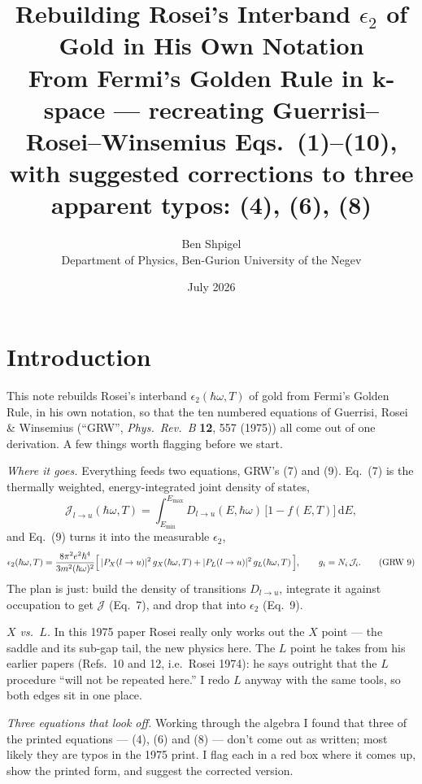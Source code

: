 \documentclass[11pt,a4paper]{article}
\title{\bfseries Rebuilding Rosei's Interband $\epsilon_2$ of Gold in
His Own Notation\\[4pt]
\large From Fermi's Golden Rule in $\mathbf{k}$-space --- recreating
Guerrisi--Rosei--Winsemius Eqs.~(1)--(10), \\ with suggested
corrections to three apparent typos: \textcolor{BrickRed}{(4), (6), (8)}}
\author{Ben Shpigel\\ \small Department of Physics, Ben-Gurion University of the Negev}
\date{July 2026}
\numberwithin{equation}{section}
\newcommand{\hw}{\hbar\omega}
\newcommand{\cJ}{\mathcal{J}}%
\newcommand{\dd}{\mathrm{d}}
\begin{document}
\maketitle

\section*{Introduction}

This note rebuilds Rosei's interband $\epsilon_2(\hw,T)$ of gold from
Fermi's Golden Rule, in his own notation, so that the ten numbered
equations of Guerrisi, Rosei \& Winsemius (``GRW'', \emph{Phys.\ Rev.\
B} \textbf{12}, 557 (1975)) all come out of one derivation. A few
things worth flagging before we start.

\medskip
\noindent\emph{Where it goes.} Everything feeds two equations, GRW's
(7) and (9). Eq.~(7) is the thermally weighted, energy-integrated joint
density of states,
\begin{equation*}
\cJ_{l\to u}(\hw,T)=\int_{E_{\min}}^{E_{\max}}
D_{l\to u}(E,\hw)\,\bigl[1-f(E,T)\bigr]\,\dd E ,
\tag{GRW~7}
\end{equation*}
and Eq.~(9) turns it into the measurable $\epsilon_2$,
\begin{equation*}
\epsilon_2(\hw,T)=\frac{8\pi^2 e^2\hbar^4}{3m^2(\hw)^2}
\Bigl[\,|P_X(l\to u)|^2\,g_X(\hw,T)
      +|P_L(l\to u)|^2\,g_L(\hw,T)\,\Bigr],
\qquad g_i=N_i\,\cJ_i .
\tag{GRW~9}
\end{equation*}
The plan is just: build the density of transitions $D_{l\to u}$,
integrate it against occupation to get $\cJ$ (Eq.~7), and drop that
into $\epsilon_2$ (Eq.~9).

\medskip
\noindent\emph{$X$ vs.\ $L$.} In this 1975 paper Rosei really only
works out the $X$ point --- the saddle and its sub-gap tail, the new
physics here. The $L$ point he takes from his earlier papers (Refs.~10
and 12, i.e.\ Rosei 1974): he says outright that the $L$ procedure
``will not be repeated here.'' I redo $L$ anyway with the same tools,
so both edges sit in one place.

\medskip
\noindent\emph{Three equations that look off.} Working through the
algebra I found that three of the printed equations --- (4), (6) and
(8) --- don't come out as written; most likely they are typos in the
1975 print. I flag each in a \textcolor{BrickRed}{red box} where it
comes up, show the printed form, and suggest the corrected version.
\end{document}
